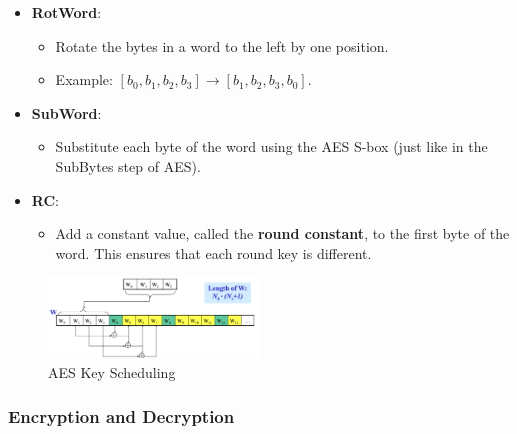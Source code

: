 \begin{itemize}
    \item \textbf{RotWord}:
    \begin{itemize}
        \item Rotate the bytes in a word to the left by one position.
        \item Example: \( [b_0, b_1, b_2, b_3] \rightarrow [b_1, b_2, b_3, b_0] \).
    \end{itemize}
    
    \item \textbf{SubWord}:
    \begin{itemize}
        \item Substitute each byte of the word using the AES S-box (just like in the SubBytes step of AES).
    \end{itemize}
    
    \item \textbf{RC}:
    \begin{itemize}
        \item Add a constant value, called the \textbf{round constant}, to the first byte of the word. This ensures that each round key is different.
    \end{itemize}
\end{itemize}


\begin{figure}[h!]
    \centering
    \includegraphics[width=0.5\textwidth]{img/AESkeyschedule.png}
    \caption{AES Key Scheduling}
\end{figure}

\subsubsection{Encryption and Decryption}

